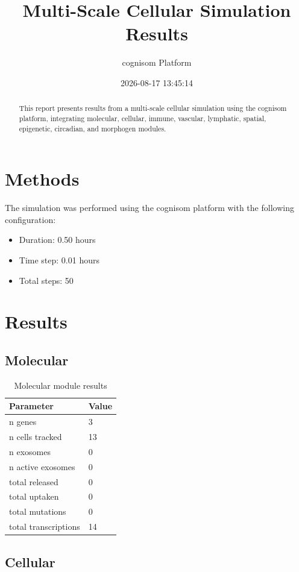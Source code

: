 \documentclass[12pt]{article}
\title{Multi-Scale Cellular Simulation Results}
\author{cognisom Platform}
\date{2026-08-17 13:45:14}
\begin{document}
\maketitle

\begin{abstract}
This report presents results from a multi-scale cellular simulation using the cognisom platform, 
integrating molecular, cellular, immune, vascular, lymphatic, spatial, epigenetic, circadian, 
and morphogen modules.
\end{abstract}

\section{Methods}

The simulation was performed using the cognisom platform with the following configuration:
\begin{itemize}
    \item Duration: 0.50 hours
    \item Time step: 0.01 hours
    \item Total steps: 50
\end{itemize}

\section{Results}

\subsection{Molecular}

\begin{table}[h]
\centering
\begin{tabular}{ll}
\toprule
Parameter & Value \\
\midrule
n genes & 3 \\
n cells tracked & 13 \\
n exosomes & 0 \\
n active exosomes & 0 \\
total released & 0 \\
total uptaken & 0 \\
total mutations & 0 \\
total transcriptions & 14 \\
\bottomrule
\end{tabular}
\caption{Molecular module results}
\end{table}

\subsection{Cellular}
\end{document}
